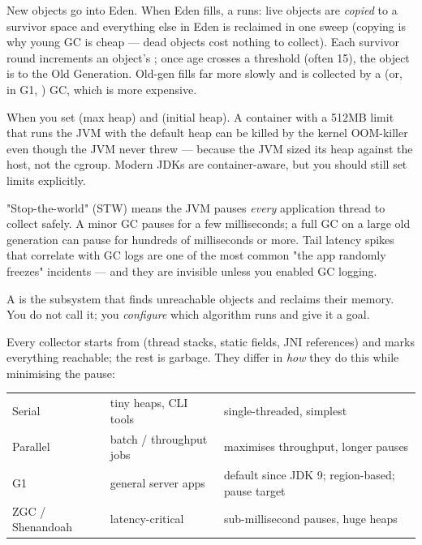  New objects go into Eden. When Eden fills, a  runs: live objects are \emph{copied} to a survivor space and everything else in Eden is reclaimed in one sweep (copying is why young GC is cheap --- dead objects cost nothing to collect). Each survivor round increments an object's ; once age crosses a threshold (often 15), the object is  to the Old Generation. Old-gen fills far more slowly and is collected by a  (or, in G1, ) GC, which is more expensive.

 When you set  (max heap) and  (initial heap). A container with a 512MB limit that runs the JVM with the default heap can be killed by the kernel OOM-killer even though the JVM never threw --- because the JVM sized its heap against the host, not the cgroup. Modern JDKs are container-aware, but you should still set limits explicitly.

\begin{behind}
"Stop-the-world" (STW) means the JVM pauses \emph{every} application thread to collect safely. A minor GC pauses for a few milliseconds; a full GC on a large old generation can pause for hundreds of milliseconds or more. Tail latency spikes that correlate with GC logs are one of the most common "the app randomly freezes" incidents --- and they are invisible unless you enabled GC logging.
\end{behind}


 A  is the subsystem that finds unreachable objects and reclaims their memory. You do not call it; you \emph{configure} which algorithm runs and give it a goal.

 Every collector starts from  (thread stacks, static fields, JNI references) and marks everything reachable; the rest is garbage. They differ in \emph{how} they do this while minimising the pause:

\begin{center}\small
\begin{tabularx}{\linewidth}{@{}L{20mm} L{30mm} X@{}}
 &  & \\\midrule
Serial & tiny heaps, CLI tools & single-threaded, simplest\\
Parallel & batch / throughput jobs & maximises throughput, longer pauses\\
G1 & general server apps & default since JDK 9; region-based; pause target\\
ZGC / Shenandoah & latency-critical & sub-millisecond pauses, huge heaps\\
\end{tabularx}
\end{center}


